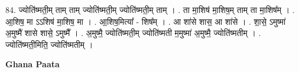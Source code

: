 \documentclass[17pt]{extarticle}
\begin{document}
84. ज्योति॑ष्मती॒म् ताम् ताम् ज्योति॑ष्मती॒म् ज्योति॑ष्मती॒म् ताम् । . ता मा॒शिष॑ मा॒शिष॒म् ताम् ता मा॒शिष᳚म् । . आ॒शिष॒ मा ऽऽशिष॑ मा॒शिष॒ मा । . आ॒शिष॒मित्या᳚ - शिष᳚म् । . आ शा॑से शास॒ आ शा॑से । . शा॒से॒ ऽमुष्मा॑ अ॒मुष्मै॑ शासे शासे॒ ऽमुष्मै᳚ । . अ॒मुष्मै॒ ज्योति॑ष्मती॒म् ज्योति॑ष्मती म॒मुष्मा॑ अ॒मुष्मै॒ ज्योति॑ष्मतीम् । . ज्योति॑ष्मती॒मिति॒ ज्योति॑ष्मतीम् । \newline

\textbf{Ghana Paata } \newline
\end{document}
